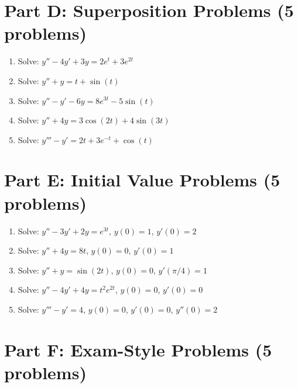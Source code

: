 \documentclass[12pt]{article}
\begin{document}
\section*{Part D: Superposition Problems (5 problems)}

\begin{enumerate}[resume]
\item Solve: $y'' - 4y' + 3y = 2e^t + 3e^{2t}$

\item Solve: $y'' + y = t + \sin(t)$

\item Solve: $y'' - y' - 6y = 8e^{3t} - 5\sin(t)$

\item Solve: $y'' + 4y = 3\cos(2t) + 4\sin(3t)$

\item Solve: $y''' - y' = 2t + 3e^{-t} + \cos(t)$
\end{enumerate}

\section*{Part E: Initial Value Problems (5 problems)}

\begin{enumerate}[resume]
\item Solve: $y'' - 3y' + 2y = e^{3t}$, $y(0) = 1$, $y'(0) = 2$

\item Solve: $y'' + 4y = 8t$, $y(0) = 0$, $y'(0) = 1$

\item Solve: $y'' + y = \sin(2t)$, $y(0) = 0$, $y'(\pi/4) = 1$

\item Solve: $y'' - 4y' + 4y = t^2e^{2t}$, $y(0) = 0$, $y'(0) = 0$

\item Solve: $y''' - y' = 4$, $y(0) = 0$, $y'(0) = 0$, $y''(0) = 2$
\end{enumerate}

\section*{Part F: Exam-Style Problems (5 problems)}
\end{document}
